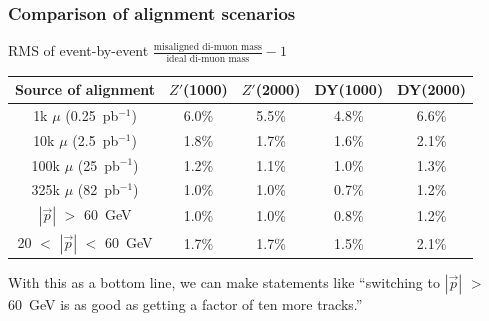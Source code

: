 \documentclass[compress]{beamer}
\begin{document}
\begin{frame}
\frametitle{Comparison of alignment scenarios}
\begin{center}
RMS of event-by-event $\displaystyle \frac{\mbox{misaligned di-muon mass}}{\mbox{ideal di-muon mass}} - 1$
\end{center}

\vfill
\renewcommand{\arraystretch}{1.2}
\begin{tabular}{c c c c c}
Source of alignment & $Z'$(1000) & $Z'$(2000) & DY(1000) & DY(2000) \\\hline
1k $\mu$ (0.25~pb$^{-1}$) & 6.0\% & 5.5\% & 4.8\% & 6.6\% \\
10k $\mu$ (2.5~pb$^{-1}$) & 1.8\% & 1.7\% & 1.6\% & 2.1\% \\
100k $\mu$ (25~pb$^{-1}$) & 1.2\% & 1.1\% & 1.0\% & 1.3\% \\
325k $\mu$ (82~pb$^{-1}$) & 1.0\% & 1.0\% & 0.7\% & 1.2\% \\\hline
$|\vec{p}|$ $>$ 60~GeV & 1.0\% & 1.0\% & 0.8\% & 1.2\% \\
20 $<$ $|\vec{p}|$ $<$ 60~GeV & 1.7\% & 1.7\% & 1.5\% & 2.1\%
\end{tabular}

\vfill\vfill With this as a bottom line, we can make statements like
``switching to $|\vec{p}|$ $>$ 60~GeV is as good as getting a factor of
ten more tracks.''
\end{frame}
\end{document}
